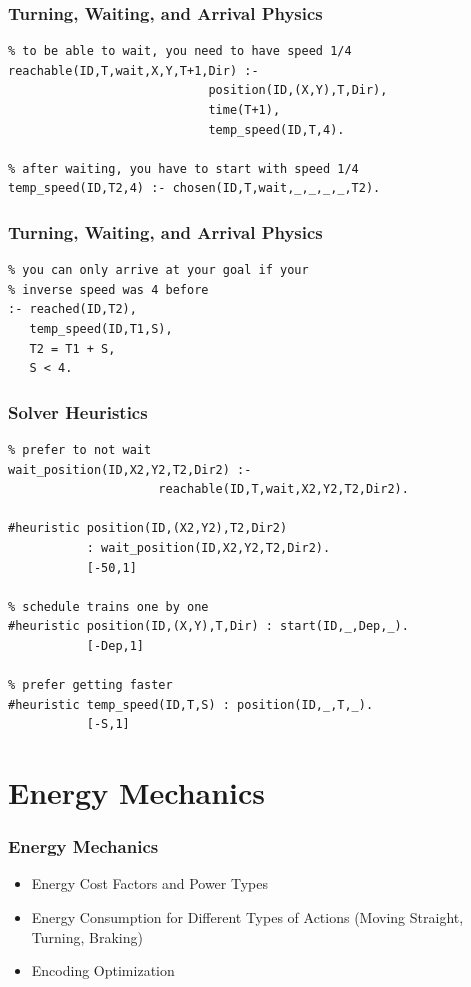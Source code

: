 \documentclass{beamer}
\begin{document}
\begin{frame}[fragile]
\frametitle{Turning, Waiting, and Arrival Physics}
\begin{verbatim}
% to be able to wait, you need to have speed 1/4
reachable(ID,T,wait,X,Y,T+1,Dir) :- 
                            position(ID,(X,Y),T,Dir),
                            time(T+1),
                            temp_speed(ID,T,4).

% after waiting, you have to start with speed 1/4
temp_speed(ID,T2,4) :- chosen(ID,T,wait,_,_,_,_,T2).
\end{verbatim}
\end{frame}

\begin{frame}[fragile]
\frametitle{Turning, Waiting, and Arrival Physics}
\begin{verbatim}
% you can only arrive at your goal if your 
% inverse speed was 4 before
:- reached(ID,T2),
   temp_speed(ID,T1,S),
   T2 = T1 + S,
   S < 4.
\end{verbatim}
\end{frame}

\begin{frame}[fragile]
\frametitle{Solver Heuristics}
\begin{verbatim}
% prefer to not wait
wait_position(ID,X2,Y2,T2,Dir2) :-
                     reachable(ID,T,wait,X2,Y2,T2,Dir2).
                     
#heuristic position(ID,(X2,Y2),T2,Dir2)
           : wait_position(ID,X2,Y2,T2,Dir2).
           [-50,1]

% schedule trains one by one
#heuristic position(ID,(X,Y),T,Dir) : start(ID,_,Dep,_).
           [-Dep,1]

% prefer getting faster
#heuristic temp_speed(ID,T,S) : position(ID,_,T,_).
           [-S,1]
\end{verbatim}
\end{frame}

\section{Energy Mechanics}
\begin{frame}
\frametitle{Energy Mechanics}
\begin{itemize}
  \item Energy Cost Factors and Power Types
  \item Energy Consumption for Different Types of Actions (Moving Straight, Turning, Braking)
  \item Encoding Optimization
\end{itemize}
\end{frame}
\end{document}
